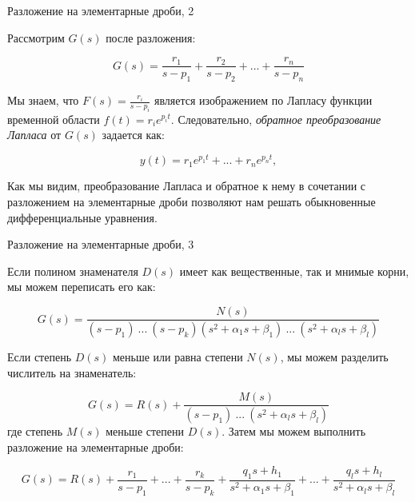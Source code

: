 \documentclass{beamer}
\begin{document}
\begin{frame}{Разложение на элементарные дроби, 2}
	\begin{flushleft}
		
		Рассмотрим $G(s)$ после разложения:
		
		\begin{equation*}
			G(s) =\frac{r_1}{s - p_1} + \frac{r_2}{s - p_2} + ... + \frac{r_n}{s - p_n}
		\end{equation*}		
		
		Мы знаем, что $F(s) = \frac{r_i}{s - p_i} $ является изображением по Лапласу функции временной области $f(t) = r_i e^{p_i t}$. Следовательно, \emph{обратное преобразование Лапласа} от $G(s)$ задается как:
		
		\begin{equation*}
			y(t) =r_1 e^{p_1 t} + ... + r_n e^{p_n t},
		\end{equation*}		
		
		Как мы видим, преобразование Лапласа и обратное к нему в сочетании с разложением на элементарные дроби позволяют нам решать обыкновенные дифференциальные уравнения.
		
	\end{flushleft}
\end{frame}




\begin{frame}{Разложение на элементарные дроби, 3}
	\begin{flushleft}
		
		Если полином знаменателя $D(s)$ имеет как вещественные, так и мнимые корни, мы можем переписать его как:
		
		\begin{equation}
			G(s) = \frac{N(s)}{(s - p_1) \ ... \ (s - p_k)(s^2 + \alpha_1 s + \beta_1) \ ... \ (s^2 + \alpha_l s + \beta_l)}
		\end{equation}		
		
		Если степень $D(s)$ меньше или равна степени $N(s)$, мы можем разделить числитель на знаменатель:
		
		\begin{equation*}
			G(s) = R(s) + \frac{M(s)}{(s - p_1) \ ... \ (s^2 + \alpha_l s + \beta_l)}
		\end{equation*}		
		где степень $M(s)$ меньше степени $D(s)$. Затем мы можем выполнить разложение на элементарные дроби:
		
		\begin{equation*}
			G(s) = R(s) + 
			\frac{r_1}{s - p_1} +  ... + \frac{r_k}{s - p_k} +  \frac{q_1 s+ h_1}{s^2 + \alpha_1 s + \beta_1} +  ... + \frac{q_l s+ h_l}{s^2 + \alpha_l s + \beta_l}
		\end{equation*}		
		
	\end{flushleft}
\end{frame}
\end{document}
